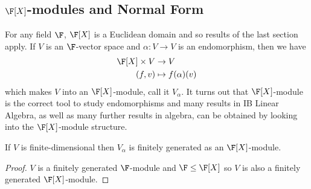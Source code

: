 \documentclass[a4paper]{article}
\begin{document}
\subsection{\texorpdfstring{\(\F[X]\)}{𝔽}-modules and Normal Form}

For any field \(\F\), \(\F[X]\) is a Euclidean domain and so results of the last section apply. If \(V\) is an \(\F\)-vector space and \(\alpha: V \to V\) is an endomorphism, then we have
\begin{align*}
  \F[X] \times V &\to V \\
  (f, v) &\mapsto f(\alpha)(v)
\end{align*}
which makes \(V\) into an \(\F[X]\)-module, call it \(V_\alpha\). It turns out that \(\F[X]\)-module is the correct tool to study endomorphisms and many results in IB Linear Algebra, as well as many further results in algebra, can be obtained by looking into the \(\F[X]\)-module structure.

\begin{lemma}
  If \(V\) is finite-dimensional then \(V_\alpha\) is finitely generated as an \(\F[X]\)-module.
\end{lemma}

\begin{proof}
  \(V\) is a finitely generated \(\F\)-module and \(\F \leq \F[X]\) so \(V\) is also a finitely generated \(\F[X]\)-module.
\end{proof}
\end{document}
